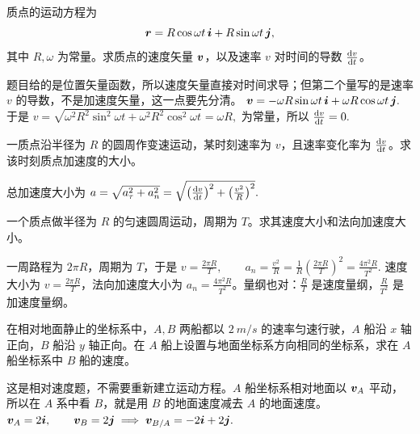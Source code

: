 \documentclass[lang=cn,11pt]{elegantbook}
\begin{document}
\begin{exercise}
质点的运动方程为
\[
\vb*{r}=R\cos\omega t\,\vb*{i}+R\sin\omega t\,\vb*{j},
\]
其中 \(R,\omega\) 为常量。求质点的速度矢量 \(\vb*{v}\)，以及速率 \(v\) 对时间的导数 \(\dv{v}{t}\)。
\end{exercise}

\begin{solution}
题目给的是位置矢量函数，所以速度矢量直接对时间求导；但第二个量写的是速率 \(v\) 的导数，不是加速度矢量，这一点要先分清。
 \(\vb*{v} =-\omega R\sin\omega t\,\vb*{i} +\omega R\cos\omega t\,\vb*{j}.\) 
于是
 \(v=\sqrt{\omega^2R^2\sin^2\omega t+\omega^2R^2\cos^2\omega t} =\omega R,\) 
为常量，所以
 \(\dv{v}{t}=0.\) 
\end{solution}

\begin{exercise}
一质点沿半径为 \(R\) 的圆周作变速运动，某时刻速率为 \(v\)，且速率变化率为 \(\dv{v}{t}\)。求该时刻质点加速度的大小。
\end{exercise}
\begin{solution}
总加速度大小为
 \(a=\sqrt{a_\tau^2+a_n^2} =\sqrt{\left(\dv{v}{t}\right)^2+\left(\frac{v^2}{R}\right)^2}.\) 
\end{solution}

\begin{exercise}[]
一个质点做半径为 \(R\) 的匀速圆周运动，周期为 \(T\)。求其速度大小和法向加速度大小。
\end{exercise}

\begin{solution}
一周路程为 \(2\pi R\)，周期为 \(T\)，于是
 \(v=\frac{2\pi R}{T},\qquad a_n=\frac{v^2}{R} =\frac{1}{R}\left(\frac{2\pi R}{T}\right)^2 =\frac{4\pi^2R}{T^2}.\) 
速度大小为 \(v=\frac{2\pi R}{T}\)，法向加速度大小为 \(a_n=\frac{4\pi^2R}{T^2}\)。量纲也对：\(\frac{R}{T}\) 是速度量纲，\(\frac{R}{T^2}\) 是加速度量纲。
\end{solution}

\begin{exercise}
在相对地面静止的坐标系中，\(A,B\) 两船都以 \(\SI{2}{m/s}\) 的速率匀速行驶，\(A\) 船沿 \(x\) 轴正向，\(B\) 船沿 \(y\) 轴正向。在 \(A\) 船上设置与地面坐标系方向相同的坐标系，求在 \(A\) 船坐标系中 \(B\) 船的速度。
\end{exercise}

\begin{solution}
这是相对速度题，不需要重新建立运动方程。\(A\) 船坐标系相对地面以 \(\vb*{v}_A\) 平动，所以在 \(A\) 系中看 \(B\)，就是用 \(B\) 的地面速度减去 \(A\) 的地面速度。
 \(\vb*{v}_A=2\vb*{i},\qquad \vb*{v}_B=2\vb*{j} \implies \vb*{v}_{B/A}=-2\vb*{i}+2\vb*{j}.\) 
\end{solution}
\end{document}
